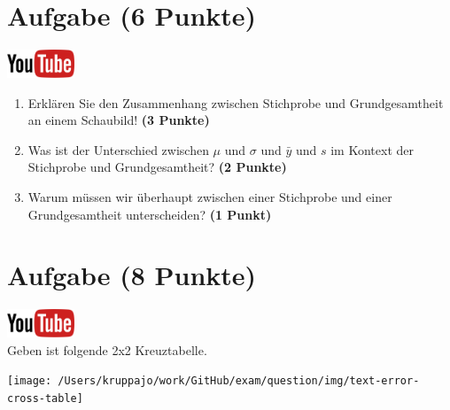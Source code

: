 \documentclass[a4paper, 10pt]{scrartcl}\usepackage[]{graphicx}\usepackage[]{xcolor}
\begin{document}
\section{Aufgabe \hfill (6 Punkte)}

\hfill\href{https://youtu.be/1S-FuQisTpE}{\includegraphics[width =
  2cm]{img/youtube}}\\[1Ex]

\begin{enumerate}
\item Erkl{\"a}ren Sie den Zusammenhang zwischen Stichprobe und Grundgesamtheit
  an einem Schaubild! \textbf{(3 Punkte)}
\item Was ist der Unterschied zwischen $\mu$ und $\sigma$ und $\bar{y}$ und
  $s$ im Kontext der Stichprobe und Grundgesamtheit? \textbf{(2 Punkte)}
\item Warum m{\"u}ssen wir {\"u}berhaupt zwischen einer Stichprobe und einer
  Grundgesamtheit unterscheiden? \textbf{(1 Punkt)}
\end{enumerate} 
\clearpage

\section{Aufgabe \hfill (8 Punkte)}

\hfill\href{https://youtu.be/3DfWs9NNrCk}{\includegraphics[width =
  2cm]{img/youtube}}\\[1Ex]




Geben ist folgende 2x2 Kreuztabelle. 

\begin{center}
  \texttt{[image: /Users/kruppajo/work/GitHub/exam/question/img/text-error-cross-table]}
\end{center}
\end{document}
